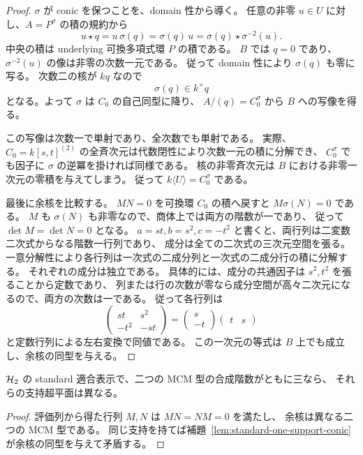 \begin{proof}
$\sigma$ が conic を保つことを、domain 性から導く。
任意の非零 $u\in U$ に対し、$A=P^\sigma$ の積の規約から
\[
 u\star q=u\,\sigma(q)
 =\sigma(q)\,u
 =\sigma(q)\star\sigma^{-2}(u).
\]
中央の積は underlying 可換多項式環 $P$ の積である。
$B$ では $q=0$ であり、$\sigma^{-2}(u)$ の像は非零の次数一元である。
従って domain 性により $\sigma(q)$ も零に写る。
次数二の核が $kq$ なので
\[
 \sigma(q)\in k^\times q
\]
となる。よって $\sigma$ は $C_0$ の自己同型に降り、
$A/(q)=C_0^\sigma$ から $B$ への写像を得る。

この写像は次数一で単射であり、全次数でも単射である。
実際、$C_0=k[s,t]^{(2)}$ の全斉次元は代数閉性により次数一元の積に分解でき、
$C_0^\sigma$ でも因子に $\sigma$ の逆冪を掛ければ同様である。
核の非零斉次元は $B$ における非零一次元の零積を与えてしまう。
従って $k\langle U\rangle=C_0^\sigma$ である。

最後に余核を比較する。
$MN=0$ を可換環 $C_0$ の積へ戻すと $M\sigma(N)=0$ である。
$M$ も $\sigma(N)$ も非零なので、商体上では両方の階数が一であり、
従って $\det M=\det N=0$ となる。
$a=st,b=s^2,c=-t^2$ と書くと、両行列は二変数二次式からなる階数一行列であり、
成分は全ての二次式の三次元空間を張る。
一意分解性により各行列は一次式の二成分列と一次式の二成分行の積に分解する。
それぞれの成分は独立である。
具体的には、成分の共通因子は $s^2,t^2$ を張ることから定数であり、
列または行の次数が零なら成分空間が高々二次元になるので、両方の次数は一である。
従って各行列は
\[
 \begin{pmatrix}st&s^2\\-t^2&-st\end{pmatrix}
 =\begin{pmatrix}s\\-t\end{pmatrix}\begin{pmatrix}t&s\end{pmatrix}
\]
と定数行列による左右変換で同値である。
この一次元の等式は $B$ 上でも成立し、余核の同型を与える。
\end{proof}

\begin{corollary}
\label{cor:standard-supports-distinct}
$\mathcal H_2$ の standard 適合表示で、二つの MCM 型の合成階数がともに三なら、
それらの支持超平面は異なる。
\end{corollary}
\begin{proof}
評価列から得た行列 $M,N$ は $MN=NM=0$ を満たし、
余核は異なる二つの MCM 型である。
同じ支持を持てば補題~\ref{lem:standard-one-support-conic} が余核の同型を与えて矛盾する。
\end{proof}

